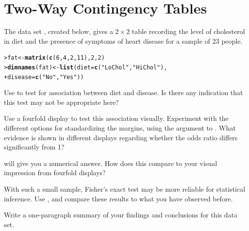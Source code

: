 \documentclass[11pt]{report}\usepackage[]{graphicx}\usepackage[]{color}
\makeatletter
\newcommand{\hlnum}[1]{\textcolor[rgb]{0.686,0.059,0.569}{#1}}%
\newcommand{\hlstr}[1]{\textcolor[rgb]{0.192,0.494,0.8}{#1}}%
\newcommand{\hlstd}[1]{\textcolor[rgb]{0.345,0.345,0.345}{#1}}%
\newcommand{\hlkwb}[1]{\textcolor[rgb]{0.69,0.353,0.396}{#1}}%
\newcommand{\hlkwc}[1]{\textcolor[rgb]{0.333,0.667,0.333}{#1}}%
\newcommand{\hlkwd}[1]{\textcolor[rgb]{0.737,0.353,0.396}{\textbf{#1}}}%
\newenvironment{kframe}{%
 \def\at@end@of@kframe{}%
 \ifinner\ifhmode%
  \def\at@end@of@kframe{\end{minipage}}%
  \begin{minipage}{\columnwidth}%
 \fi\fi%
 \def\FrameCommand##1{\hskip\@totalleftmargin \hskip-\fboxsep
 \colorbox{shadecolor}{##1}\hskip-\fboxsep
     \hskip-\linewidth \hskip-\@totalleftmargin \hskip\columnwidth}%
 \MakeFramed {\advance\hsize-\width
   \@totalleftmargin\z@ \linewidth\hsize
   \@setminipage}}%
 {\par\unskip\endMakeFramed%
 \at@end@of@kframe}
\newenvironment{knitrout}{}{} %
\renewenvironment{knitrout}{\small\renewcommand{\baselinestretch}{.85}}{} %
\makeatother
\begin{document}
\chapter{Two-Way Contingency Tables}\label{ch:twoway}


\begin{Exercises}

  \exercise The data set , created below, gives a $2 \times 2$ table recording the level of
  cholesterol in diet and the presence of symptoms of heart disease for a sample of
  23 people.

\begin{knitrout}
\color{fgcolor}\begin{kframe}
\begin{alltt}
\hlstd{> }\hlstd{fat} \hlkwb{<-} \hlkwd{matrix}\hlstd{(}\hlkwd{c}\hlstd{(}\hlnum{6}\hlstd{,} \hlnum{4}\hlstd{,} \hlnum{2}\hlstd{,} \hlnum{11}\hlstd{),} \hlnum{2}\hlstd{,} \hlnum{2}\hlstd{)}
\hlstd{> }\hlkwd{dimnames}\hlstd{(fat)} \hlkwb{<-} \hlkwd{list}\hlstd{(}\hlkwc{diet} \hlstd{=} \hlkwd{c}\hlstd{(}\hlstr{"LoChol"}\hlstd{,} \hlstr{"HiChol"}\hlstd{),}
\hlstd{+ }                      \hlkwc{disease} \hlstd{=} \hlkwd{c}\hlstd{(}\hlstr{"No"}\hlstd{,} \hlstr{"Yes"}\hlstd{))}
\end{alltt}
\end{kframe}
\end{knitrout}

  \begin{enumerate*}
    \item Use  to test for association between diet and disease.
    Is there any indication that this test may not be appropriate here?
    \item Use a fourfold display to test this association visually.  Experiment with
    the different options for standardizing the margins, using the 
    argument to . What evidence is shown in different displays regarding
    whether the odds ratio differs significantly from 1?
    \item {} will give you a numerical answer.  How does
    this compare to your visual impression from fourfold displays?
    \item With such a small sample, Fisher's exact test may be more reliable for statistical
    inference.  Use , and compare these results to what you have
    observed before.
    \item Write a one-paragraph summary of your findings and conclusions for this data set.
  \end{enumerate*}


\end{Exercises}
\end{document}
